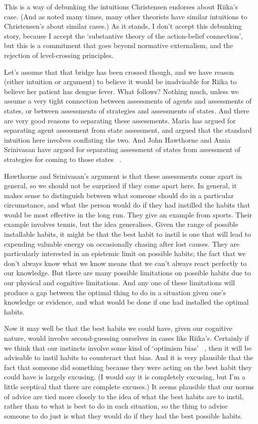 This is a way of debunking the intuitions Christensen endorses about \gls{Riika}'s case. (And as noted many times, many other theorists have similar intuitions to Christensen's about similar cases.) As it stands, I don't accept this debunking story, because I accept the `substantive theory of the action-belief connection', but this is a commitment that goes beyond normative externalism, and the rejection of level-crossing principles.

Let's assume that that bridge has been crossed though, and we have reason (either intuition or argument) to believe it would be inadvisable for \gls{Riika} to believe her patient has dengue fever. What follows? Nothing much, unless we assume a very tight connection between assessments of agents and assessments of states, or between assessments of strategies and assessments of states. And there are very good reasons to separating these assessments. Maria \citet{Lasonen-Aarnio2010b, Lasonen-Aarnio2014} has argued for separating agent assessment from state assessment, and argued that the standard intuition here involves conflating the two. And John Hawthorne and Amia Srinivasan have argued for separating assessment of states from assessment of strategies for coming to those states ~\citep{HawthorneSrinivasan2013}.

Hawthorne and Srinivasan's argument is that these assessments come apart in general, so we should not be surprised if they come apart here. In general, it makes sense to distinguish between what someone should do in a particular circumstance, and what the person would do if they had instilled the habits that would be most effective in the long run. They give an example from sports. Their example involves tennis, but the idea generalises. Given the range of possible installable habits, it might be that the best habit to instil is one that will lead to expending valuable energy on occasionally chasing after lost causes. They are particularly interested in an epistemic limit on possible habits; the fact that we don't always know what we know means that we can't always react perfectly to our knowledge. But there are many possible limitations on possible habits due to our physical and cognitive limitations. And any one of these limitations will produce a gap between the optimal thing to do in a situation given one's knowledge or evidence, and what would be done if one had installed the optimal habits.

Now it may well be that the best habits we could have, given our cognitive nature, would involve second-guessing ourselves in cases like \gls{Riika}'s. Certainly if we think that our instincts involve some kind of `optimism bias' ~\citep{Sharot2012}, then it will be advisable to instil habits to counteract that bias. And it is very plausible that the fact that someone did something because they were acting on the best habit they could have is largely excusing. (I would say it is completely excusing, but I'm a little sceptical that there are complete excuses.) It seems plausible that our norms of advice are tied more closely to the idea of what the best habits are to instil, rather than to what is best to do in each situation, so the thing to advise someone to do just is what they would do if they had the best possible habits.

